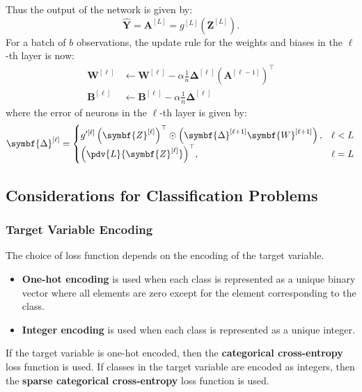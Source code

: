 \documentclass{article}
\begin{document}
Thus the output of the network is given by:
\begin{equation*}
    \hat{\symbf{Y}} = \symbf{A}^{\left[ L \right]} = g^{\left[ L \right]}\left( \symbf{Z}^{\left[ L \right]} \right).
\end{equation*}
For a batch of \(b\) observations, the update rule for the weights and
biases in the \(\ell\)-th layer is now:
\begin{align*}
    \symbf{W}^{\left[ \ell \right]} & \leftarrow \symbf{W}^{\left[ \ell \right]} - \alpha \frac{1}{n} \symbf{\Delta}^{\left[ \ell \right]} {\left( \symbf{A}^{\left[ \ell - 1 \right]} \right)}^\top \\
    \symbf{B}^{\left[ \ell \right]} & \leftarrow \symbf{B}^{\left[ \ell \right]} - \alpha \frac{1}{n} \symbf{\Delta}^{\left[ \ell \right]}
\end{align*}
where the error of neurons in the \(\ell\)-th layer is given by:
\begin{equation*}
    \symbf{\Delta}^{\left[ \ell \right]} =
    \begin{cases}
        \displaystyle {g^{\prime\left[ \ell \right]}\left( \symbf{Z}^{\left[ \ell \right]} \right)}^\top \odot \left( \symbf{\Delta}^{\left[ \ell + 1 \right]} \symbf{W}^{\left[ \ell + 1 \right]} \right), & \ell < L \\
        \displaystyle {\left( \pdv{L}{\symbf{Z}^{\left[ \ell \right]}} \right)}^\top,                                                                                                                       & \ell = L
    \end{cases}
\end{equation*}
\subsection{Considerations for Classification Problems}
\subsubsection{Target Variable Encoding}
The choice of loss function depends on the encoding of the target
variable.
\begin{itemize}
    \item \textbf{One-hot encoding} is used when each class is represented
          as a unique binary vector where all elements are zero except for the
          element corresponding to the class.
    \item \textbf{Integer encoding} is used when each class is represented
          as a unique integer.
\end{itemize}
If the target variable is one-hot encoded, then the \textbf{categorical
    cross-entropy} loss function is used. If classes in the target variable
are encoded as integers, then the \textbf{sparse categorical cross-entropy}
loss function is used.
\end{document}

